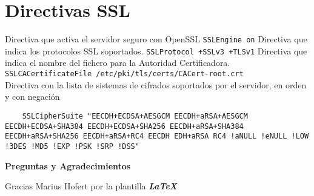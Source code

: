 \documentclass[
paper=128mm:96mm, %
fontsize=11pt, %
pagesize, %
parskip=half-, %
]{scrartcl} %
\begin{document}

\section{Directivas SSL }
\begin{multicols}{2}
	Directiva que activa el servidor seguro con OpenSSL	\lstinline|SSLEngine on|
	Directiva que indica los protocolos SSL soportados. \lstinline|SSLProtocol +SSLv3 +TLSv1|
	Directiva que indica el nombre del fichero para la Autoridad Certificadora. \lstinline|SSLCACertificateFile /etc/pki/tls/certs/CACert-root.crt|\\
	Directiva con la lista de sistemas de cifrados soportados por el servidor, en orden y con negación
	\begin{lstlisting}
	SSLCipherSuite "EECDH+ECDSA+AESGCM EECDH+aRSA+AESGCM EECDH+ECDSA+SHA384 EECDH+ECDSA+SHA256 EECDH+aRSA+SHA384 EECDH+aRSA+SHA256 EECDH+aRSA+RC4 EECDH EDH+aRSA RC4 !aNULL !eNULL !LOW !3DES !MD5 !EXP !PSK !SRP !DSS"
	\end{lstlisting}
\end{multicols}
\clearpage





\clearpage


\thispagestyle{empty} %

\begin{flushright}
\vspace{0.6cm}
\color{white}\sffamily
{\bfseries\LARGE Preguntas y Agradecimientos\par} %
\vfill
\end{flushright}
Gracias Marius Hofert por la plantilla \Large{\textit{\textbf{LaTeX}}}

\thispagestyle{empty} %
\end{document}
